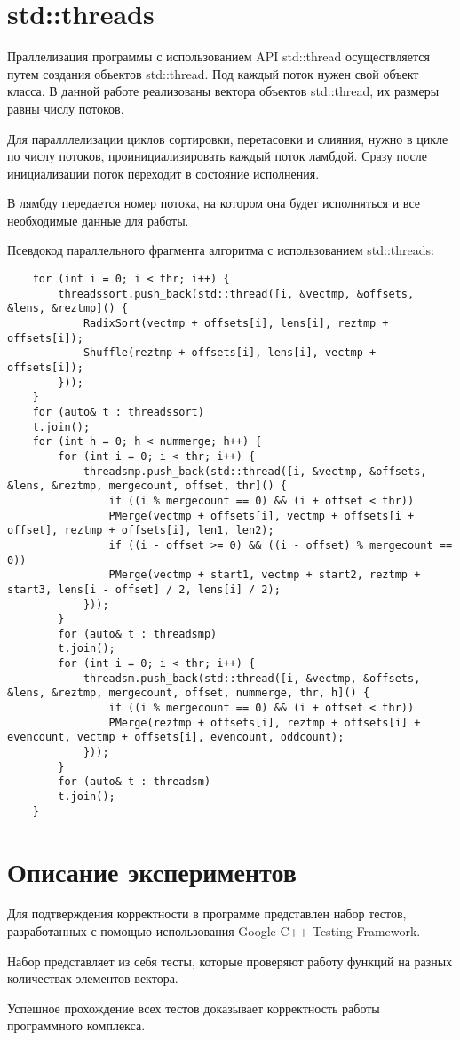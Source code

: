 \documentclass{report}
\begin{document}
\section*{std::threads}
Праллелизация программы с использованием API std::thread осуществляется путем создания объектов std::thread. Под каждый поток нужен свой объект класса. В данной работе реализованы вектора объектов std::thread, их размеры равны числу потоков.
\par Для паралллелизации циклов сортировки, перетасовки и слияния, нужно в цикле по числу потоков, проинициализировать каждый поток ламбдой. Сразу после инициализации поток переходит в состояние исполнения. 
\par В лямбду передается номер потока, на котором она будет исполняться и все необходимые данные для работы.
\par Псевдокод параллельного фрагмента алгоритма с использованием std::threads:
\begin{lstlisting}
	for (int i = 0; i < thr; i++) {
		threadssort.push_back(std::thread([i, &vectmp, &offsets, &lens, &reztmp]() {
			RadixSort(vectmp + offsets[i], lens[i], reztmp + offsets[i]);
			Shuffle(reztmp + offsets[i], lens[i], vectmp + offsets[i]);
		}));
	}
	for (auto& t : threadssort)
	t.join();
	for (int h = 0; h < nummerge; h++) {
		for (int i = 0; i < thr; i++) {
			threadsmp.push_back(std::thread([i, &vectmp, &offsets, &lens, &reztmp, mergecount, offset, thr]() {
				if ((i % mergecount == 0) && (i + offset < thr)) 
				PMerge(vectmp + offsets[i], vectmp + offsets[i + offset], reztmp + offsets[i], len1, len2);
				if ((i - offset >= 0) && ((i - offset) % mergecount == 0)) 
				PMerge(vectmp + start1, vectmp + start2, reztmp + start3, lens[i - offset] / 2, lens[i] / 2);
			}));
		}
		for (auto& t : threadsmp)
		t.join();
		for (int i = 0; i < thr; i++) {
			threadsm.push_back(std::thread([i, &vectmp, &offsets, &lens, &reztmp, mergecount, offset, nummerge, thr, h]() {
				if ((i % mergecount == 0) && (i + offset < thr)) 
				PMerge(reztmp + offsets[i], reztmp + offsets[i] + evencount, vectmp + offsets[i], evencount, oddcount);
			}));
		}
		for (auto& t : threadsm)
		t.join();
	}
\end{lstlisting}
\newpage

\section*{Описание экспериментов}
Для подтверждения корректности в программе представлен набор тестов, разработанных с помощью использования Google C++ Testing Framework.
\par Набор представляет из себя тесты, которые проверяют работу функций на разных количествах элементов вектора.
\par Успешное прохождение всех тестов доказывает корректность работы программного комплекса.
\newpage
\end{document}
